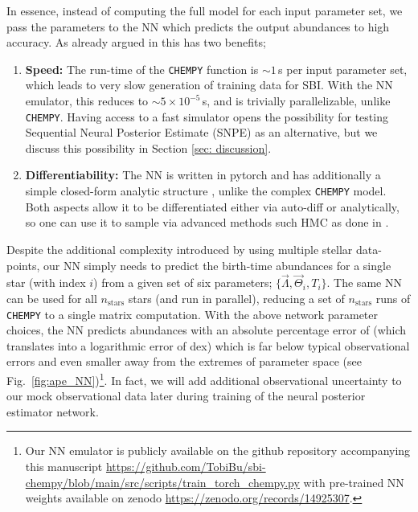 \documentclass{aa}
\begin{document}
In essence, instead of computing the full model for each input parameter set, we pass the parameters to the NN which predicts the output abundances to high accuracy. As already argued in \cite{Philcox_2019} this has two benefits;
\begin{enumerate}
    \item \textbf{Speed:} The run-time of the \texttt{CHEMPY} function is $\sim1$\,s per input parameter set, which leads to very slow generation of training data for SBI. With the NN emulator, this reduces to $\sim5\times10^{-5}$\,s, and is trivially parallelizable, unlike \texttt{CHEMPY}. Having access to a fast simulator opens the possibility for testing Sequential Neural Posterior Estimate (SNPE) as an alternative, but we discuss this possibility in Section \ref{sec: discussion}. 
    \item \textbf{Differentiability:} The NN is written in pytorch and has additionally a simple closed-form analytic structure \citep[described in the appendix of][]{Philcox_2019}, unlike the complex \texttt{CHEMPY} model. Both aspects allow it to be differentiated either via auto-diff or analytically, so one can use it to sample via advanced methods such HMC as done in \citep{Philcox_2019}.
\end{enumerate}

Despite the additional complexity introduced by using multiple stellar data-points, our NN simply needs to predict the birth-time abundances for a single star (with index $i$) from a given set of six parameters; $\{\vec\Lambda,\vec\Theta_i,T_i\}$. The same NN can be used for all $n_\mathrm{stars}$ stars (and run in parallel), reducing a set of $n_\mathrm{stars}$ runs of \texttt{CHEMPY} to a single matrix computation. With the above network parameter choices, the NN predicts abundances with an absolute percentage error of  (which translates into a logarithmic error of  dex)  
which is far below typical observational errors and even smaller away from the extremes of parameter space (see Fig.~\ref{fig:ape_NN})\footnote{Our NN emulator is publicly available on the github repository accompanying this manuscript \href{https://github.com/TobiBu/sbi-chempy/blob/main/src/scripts/train_torch_chempy.py}{https://github.com/TobiBu/sbi-chempy/blob/main/src/scripts/train\_torch\_chempy.py} with pre-trained NN weights available on zenodo \href{https://zenodo.org/records/14925307}{https://zenodo.org/records/14925307}.}. In fact, we will add additional observational uncertainty to our mock observational data later during training of the neural posterior estimator network. 
\end{document}
